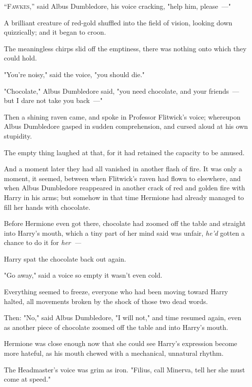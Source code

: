 
\lettrine{“F}{awkes,''} said
Albus Dumbledore, his voice cracking, "help him, please~---"

A brilliant creature of red-gold shuffled into the field of vision, looking
down quizzically; and it began to croon.

The meaningless chirps slid off the emptiness, there was nothing onto which
they could hold.

"You're noisy," said the voice, "you should die."

"Chocolate," Albus Dumbledore said, "you need chocolate, and your friends~--- but
I dare not take you back~---"

Then a shining raven came, and spoke in Professor Flitwick's voice; whereupon
Albus Dumbledore gasped in sudden comprehension, and cursed aloud at his own
stupidity.

The empty thing laughed at that, for it had retained the capacity to be amused.

And a moment later they had all vanished in another flash of fire.
\sbreak
It was only a moment, it seemed, between when Flitwick's raven had flown to
elsewhere, and when Albus Dumbledore reappeared in another crack of red and
golden fire with Harry in his arms; but somehow in that time Hermione had
already managed to fill her hands with chocolate.

Before Hermione even got there, chocolate had zoomed off the table and straight
into Harry's mouth, which a tiny part of her mind said was unfair, \emph{he'd}
gotten a chance to do it for \emph{her~--- }

Harry spat the chocolate back out again.

"Go away," said a voice so empty it wasn't even cold.

{\el}

Everything seemed to freeze, everyone who had been moving toward Harry halted,
all movements broken by the shock of those two dead words.

Then: "No," said Albus Dumbledore, "I will not," and time resumed again, even
as another piece of chocolate zoomed off the table and into Harry's mouth.

Hermione was close enough now that she could see Harry's expression become more
hateful, as his mouth chewed with a mechanical, unnatural rhythm.

The Headmaster's voice was grim as iron. "Filius, call Minerva, tell her she
must come at speed."

